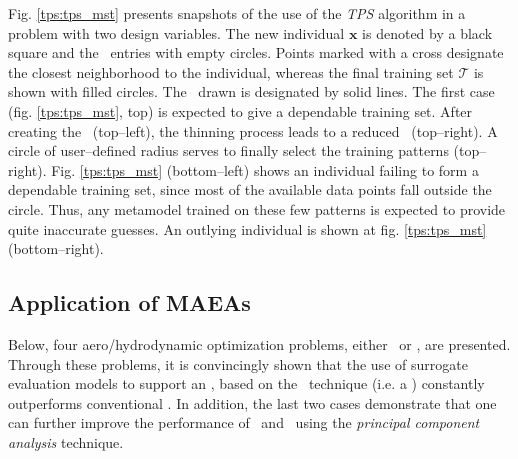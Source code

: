 \documentclass{vki_ls}
\newcommand{\vect}[1]{\bm{#1}}
\newcommand{\set}[1]{\mathcal{#1}}
\begin{document}
Fig. \ref{tps:tps_mst} presents snapshots of the use of the
\emph{TPS} algorithm in a problem with two design variables. The new
individual $\vect{x}$ is denoted by a black square and the \DB\
entries with empty circles. Points marked with a cross designate the
closest neighborhood to the individual, whereas the final training
set $\set{T}$ is shown with filled circles. The \MST\ drawn is
designated by solid lines. The first case (fig. \ref{tps:tps_mst},
top) is expected to give a dependable training set. After creating
the \MST\ (top--left), the thinning process leads to a reduced \MST\
(top--right). A circle of user--defined radius serves to finally
select the training patterns (top--right). Fig. \ref{tps:tps_mst}
(bottom--left) shows an individual failing to form a dependable
training set, since most of the available data points fall outside
the circle. Thus, any metamodel trained on these few patterns is
expected to provide quite inaccurate guesses. An outlying individual
is shown at fig. \ref{tps:tps_mst} (bottom--right). 

%
\subsection[Application of MAEAs]
{Application of MAEAs}
\label{s:maeasapp}


Below, four aero/hydrodynamic optimization problems, either \SOO\ or \MOO, are presented.
Through these problems, it is convincingly shown that the use of surrogate evaluation models to support an \EA, based on the \IPE\ technique (i.e. a \MAEA) constantly outperforms conventional \EAs. In addition, the last two cases demonstrate that one can further improve the performance of \EAs\ and \MAEAs\ using the \textit{principal component analysis} technique.
\end{document}
